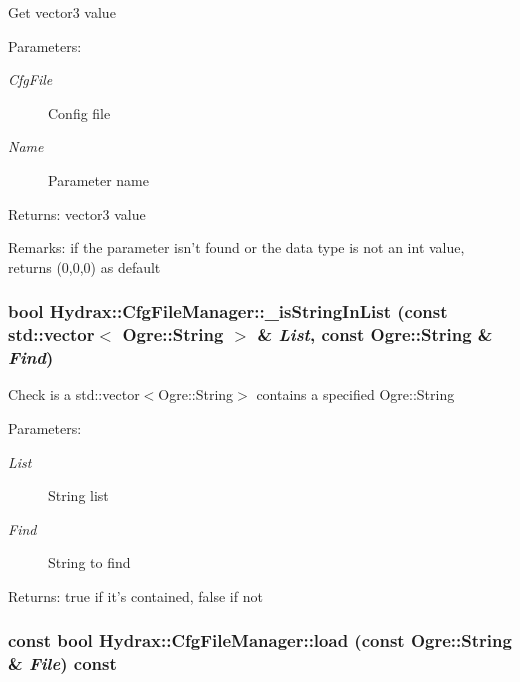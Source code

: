 Get vector3 value \begin{Desc}
\item[Parameters:]
\begin{description}
\item[{\em CfgFile}]Config file \item[{\em Name}]Parameter name \end{description}
\end{Desc}
\begin{Desc}
\item[Returns:]vector3 value \end{Desc}
\begin{Desc}
\item[Remarks:]if the parameter isn't found or the data type is not an int value, returns (0,0,0) as default \end{Desc}
\hypertarget{class_hydrax_1_1_cfg_file_manager_feef5772fec0c214f374cbd3cf9f1a17}{
\subsubsection[{\_\-isStringInList}]{\setlength{\rightskip}{0pt plus 5cm}bool Hydrax::CfgFileManager::\_\-isStringInList (const std::vector$<$ Ogre::String $>$ \& {\em List}, \/  const Ogre::String \& {\em Find})}}
\label{class_hydrax_1_1_cfg_file_manager_feef5772fec0c214f374cbd3cf9f1a17}


Check is a std::vector$<$Ogre::String$>$ contains a specified Ogre::String \begin{Desc}
\item[Parameters:]
\begin{description}
\item[{\em List}]String list \item[{\em Find}]String to find \end{description}
\end{Desc}
\begin{Desc}
\item[Returns:]true if it's contained, false if not \end{Desc}
\hypertarget{class_hydrax_1_1_cfg_file_manager_7d283a6b6b61ad70292c7cb24cd3543c}{
\subsubsection[{load}]{\setlength{\rightskip}{0pt plus 5cm}const bool Hydrax::CfgFileManager::load (const Ogre::String \& {\em File}) const}}
\label{class_hydrax_1_1_cfg_file_manager_7d283a6b6b61ad70292c7cb24cd3543c}


